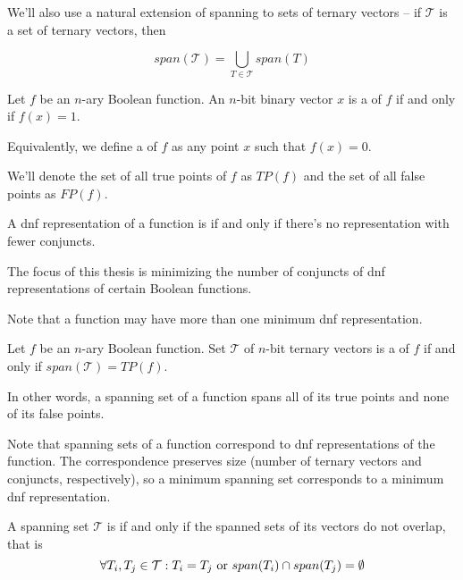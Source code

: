 We'll also use a natural extension of spanning
to sets of ternary vectors --
if $\mathcal{T}$ is a set of ternary vectors, then

\begin{equation*}
span(\mathcal{T}) =
\bigcup_{T \in \mathcal{T}} span(T)
\end{equation*}

\begin{definition}
Let $f$ be an $n$-ary Boolean function.
An $n$-bit binary vector $x$ is a 
of $f$ if and only if $f(x)  = 1$.
\end{definition}

Equivalently,
we define a  of $f$
as any point $x$
such that $f(x) = 0$.

We'll denote the set of all true points of $f$ as $TP(f)$
and the set of all false points as $FP(f)$.

\begin{definition}
A \acrshort{dnf} representation of a function is
if and only if
there's no representation with fewer conjuncts.
\end{definition}

The focus of this thesis is
minimizing the number of conjuncts
of \acrshort{dnf} representations
of certain Boolean functions.

Note that a function may have more than one minimum
\acrshort{dnf} representation.

\begin{definition}
Let $f$ be an $n$-ary Boolean function.
Set $\mathcal{T}$ of $n$-bit ternary vectors
is a  of $f$
if and only if
$span(\mathcal{T}) = TP(f)$.
\end{definition}

In other words,
a spanning set of a function
spans all of its true points
and none of its false points.

Note that spanning sets of a function
correspond to \acrshort{dnf} representations
of the function.
The correspondence preserves size
(number of ternary vectors and conjuncts, respectively),
so a minimum spanning set
corresponds to a minimum \acrshort{dnf} representation.

\begin{definition}
A spanning set $\mathcal{T}$ is 
if and only if the spanned sets of its vectors
do not overlap,
that is
\[
\forall T_i, T_j \in \mathcal{T} : T_i = T_j \text{ or }
span(T_i) \cap span(T_j) = \emptyset
\]
\end{definition}

